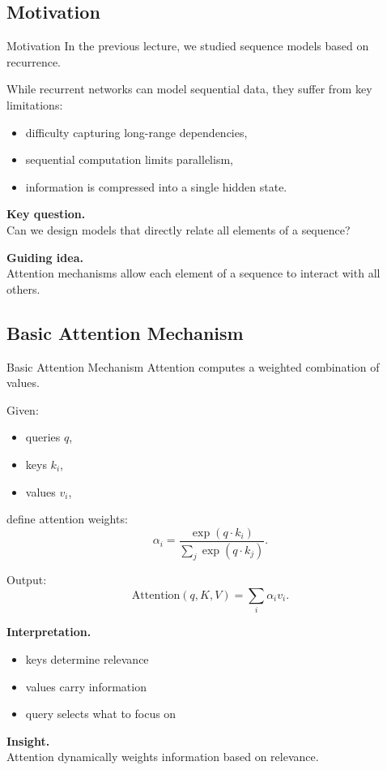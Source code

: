 \documentclass[aspectratio=169,11pt]{beamer}
\begin{document}
\subsection{Motivation}
\begin{frame}[t,allowframebreaks]{Motivation}
\small
In the previous lecture, we studied sequence models based on recurrence.

While recurrent networks can model sequential data, they suffer from key limitations:

\begin{itemize}
    \item difficulty capturing long-range dependencies,
    \item sequential computation limits parallelism,
    \item information is compressed into a single hidden state.
\end{itemize}

\textbf{Key question.}\\ Can we design models that directly relate all elements of a sequence?

\textbf{Guiding idea.}\\ Attention mechanisms allow each element of a sequence to interact with all others.
\end{frame}

\subsection{Basic Attention Mechanism}
\begin{frame}[t,allowframebreaks]{Basic Attention Mechanism}
\small
Attention computes a weighted combination of values.

Given:
\begin{itemize}
    \item queries $q$,
    \item keys $k_i$,
    \item values $v_i$,
\end{itemize}

define attention weights:
\[
\alpha_i = \frac{\exp(q \cdot k_i)}{\sum_j \exp(q \cdot k_j)}.
\]

Output:
\[
\text{Attention}(q, K, V) = \sum_i \alpha_i v_i.
\]

\textbf{Interpretation.}\\ \begin{itemize}
    \item keys determine relevance
    \item values carry information
    \item query selects what to focus on
\end{itemize}

\textbf{Insight.}\\ Attention dynamically weights information based on relevance.
\end{frame}
\end{document}
